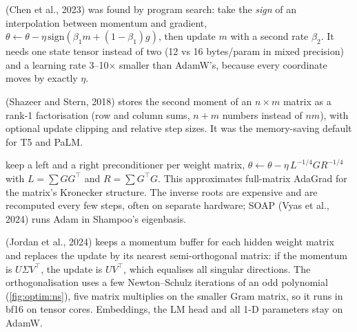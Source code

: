\begin{description}[leftmargin=1.2em, style=nextline]
  \item[Lion] (Chen et al., 2023) was found by program search: take the \emph{sign} of an
    interpolation between momentum and gradient, $\theta \leftarrow \theta -
    \eta\,\mathrm{sign}(\beta_1 m + (1-\beta_1) g)$, then update $m$ with a second rate
    $\beta_2$. It needs one state tensor instead of two (12 vs 16 bytes/param in mixed precision) and
    a learning rate 3--10$\times$ smaller than AdamW's, because every coordinate moves by exactly
    $\eta$.
  \item[Adafactor] (Shazeer and Stern, 2018) stores the second moment of an $n\times m$ matrix
    as a rank-1 factorisation (row and column sums, $n+m$ numbers instead of $nm$), with optional
    update clipping and relative step sizes. It was the memory-saving default for T5 and PaLM.
  \item[Shampoo and SOAP] keep a left and a right preconditioner per weight matrix,
    $\theta\leftarrow\theta-\eta\,L^{-1/4} G R^{-1/4}$ with $L=\sum GG^\top$ and
    $R=\sum G^\top G$. This approximates full-matrix AdaGrad for the matrix's Kronecker
    structure. The inverse roots are expensive and are recomputed every few steps, often on
    separate hardware; SOAP (Vyas et al., 2024) runs Adam in Shampoo's eigenbasis.
  \item[Muon] (Jordan et al., 2024) keeps a momentum buffer for each hidden weight matrix and
    replaces the update by its nearest semi-orthogonal matrix: if the momentum is $U\Sigma V^\top$,
    the update is $UV^\top$, which equalises all singular directions. The orthogonalisation uses a few
    Newton--Schulz iterations of an odd polynomial (\cref{fig:optim:ns}), five matrix multiplies on the smaller
    Gram matrix, so it runs in bf16 on tensor cores. Embeddings, the LM head and all 1-D
    parameters stay on AdamW.
\end{description}

